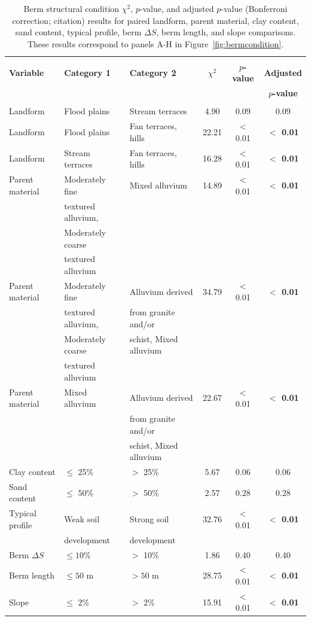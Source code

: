 \documentclass[review]{elsarticle}
\begin{document}
\begin{table}[htb!]
\centering
\caption{\normalsize Berm structural condition $\chi^2$, $p$-value, and adjusted $p$-value (Bonferroni correction; citation) results for paired landform, parent material, clay content, sand content, typical profile, berm $\Delta S$, berm length, and slope comparisons. These results correspond to panels A-H in Figure~\ref{fig:bermcondition}.}
\small
\begin{tabular}{l|l|l|c|c|c}
\hline
& \\[\dimexpr-\normalbaselineskip+2pt]
\textbf{Variable} & \textbf{Category 1} & \textbf{Category 2} & \textbf{$\chi^2$} & \textbf{$p$-value} & \textbf{Adjusted} \\
& & & & & \textbf{$p$-value} \\
& \\[\dimexpr-\normalbaselineskip+2pt]
\hline
Landform & Flood plains & Stream terraces & 4.90 & 0.09 & 0.09 \\
Landform & Flood plains & Fan terraces, hills & 22.21 & $<$ 0.01 & \textbf{$<$ 0.01} \\
Landform & Stream terraces & Fan terraces, hills & 16.28 & $<$ 0.01 & \textbf{$<$ 0.01} \\
Parent material & Moderately fine & Mixed alluvium & 14.89 & $<$ 0.01 & \textbf{$<$ 0.01} \\ 
& textured alluvium, & & & & \\ 
& Moderately coarse & & & & \\ 
& textured alluvium & & & & \\ 
Parent material & Moderately fine & Alluvium derived & 34.79 & $<$ 0.01 & \textbf{$<$ 0.01} \\ 
& textured alluvium, & from granite and/or & & & \\  
& Moderately coarse & schist, Mixed alluvium & & & \\ 
& textured alluvium & & & & \\ 
Parent material & Mixed alluvium & Alluvium derived & 22.67 & $<$ 0.01 & \textbf{$<$ 0.01} \\
& & from granite and/or & & & \\ 
& & schist, Mixed alluvium & & & \\
Clay content & $\leq$ 25\% & $>$ 25\% & 5.67 & 0.06 & 0.06 \\
Sand content & $\leq$ 50\% & $>$ 50\% & 2.57 & 0.28 & 0.28 \\
Typical profile & Weak soil & Strong soil & 32.76 & $<$ 0.01 & \textbf{$<$ 0.01} \\ 
& development & development & & & \\ 
Berm $\Delta S$ & $\leq 10\%$ & $>$ 10\% & 1.86 & 0.40 & 0.40 \\
Berm length & $\leq 50$ m & $> 50$ m & 28.75 & $<$ 0.01 & \textbf{$<$ 0.01} \\
Slope & $\leq$ 2\% & $>$ 2\% & 15.91 & $<$ 0.01 & \textbf{$<$ 0.01} \\
\hline
\end{tabular}
\label{tab:bermcondition}
\end{table}
\end{document}
